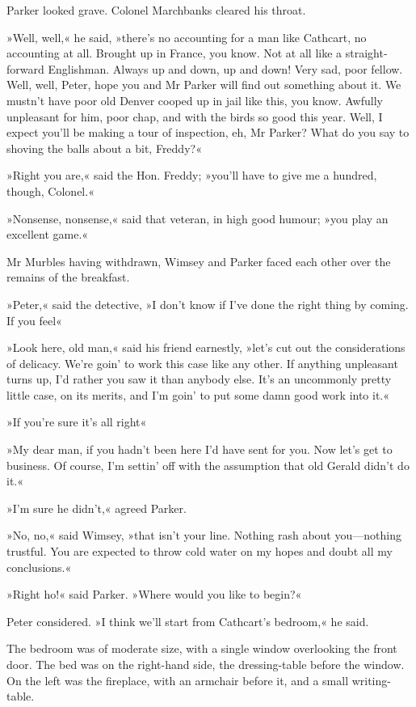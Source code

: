 Parker looked grave. Colonel Marchbanks cleared his throat.

»Well, well,« he said, »there's no accounting for a man like Cathcart, no accounting at all. Brought up in France, you know. Not at all like a straight-forward Englishman. Always up and down, up and down! Very sad, poor fellow. Well, well, Peter, hope you and Mr Parker will find out something about it. We mustn't have poor old Denver cooped up in jail like this, you know. Awfully unpleasant for him, poor chap, and with the birds so good this year. Well, I expect you'll be making a tour of inspection, eh, Mr Parker? What do you say to shoving the balls about a bit, Freddy?«

»Right you are,« said the Hon. Freddy; »you'll have to give me a hundred, though, Colonel.«

»Nonsense, nonsense,« said that veteran, in high good humour; »you play an excellent game.«

Mr Murbles having withdrawn, Wimsey and Parker faced each other over the remains of the breakfast.

»Peter,« said the detective, »I don't know if I've done the right thing by coming. If you feel\longdash«

»Look here, old man,« said his friend earnestly, »let's cut out the considerations of delicacy. We're goin' to work this case like any other. If anything unpleasant turns up, I'd rather you saw it than anybody else. It's an uncommonly pretty little case, on its merits, and I'm goin' to put some damn good work into it.«

»If you're sure it's all right\longdash«

»My dear man, if you hadn't been here I'd have sent for you. Now let's get to business. Of course, I'm settin' off with the assumption that old Gerald didn't do it.«

»I'm sure he didn't,« agreed Parker.

»No, no,« said Wimsey, »that isn't your line. Nothing rash about you\allowbreak---\allowbreak nothing trustful. You are expected to throw cold water on my hopes and doubt all my conclusions.«

»Right ho!« said Parker. »Where would you like to begin?«

Peter considered. »I think we'll start from Cathcart's bedroom,« he said.

The bedroom was of moderate size, with a single window overlooking the front door. The bed was on the right-hand side, the dressing-table before the window. On the left was the fireplace, with an armchair before it, and a small writing-table.

